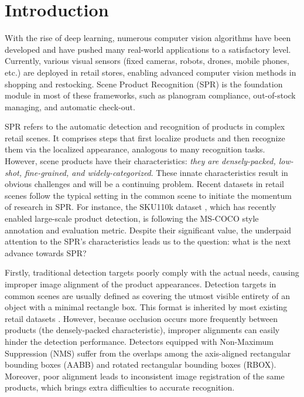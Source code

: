 \documentclass[runningheads]{llncs}
\begin{document}
\section{Introduction}
With the rise of deep learning, numerous computer vision algorithms have been developed and have pushed many real-world applications to a satisfactory level. Currently, various visual sensors (fixed cameras, robots, drones, mobile phones, etc.) are deployed in retail stores, enabling advanced computer vision methods in shopping and restocking. Scene Product Recognition (SPR) is the foundation module in most of these frameworks, such as planogram compliance, out-of-stock managing, and automatic check-out.

SPR refers to the automatic detection and recognition of products in complex retail scenes. It comprises steps that first localize products and then recognize them via the localized appearance, analogous to many recognition tasks. However, scene products have their characteristics: \textit{they are densely-packed, low-shot, fine-grained, and widely-categorized}. These innate characteristics result in obvious challenges and will be a continuing problem. Recent datasets in retail scenes follow the typical setting in the common scene to initiate the momentum of research in SPR. For instance, the SKU110k dataset \cite{SKU110k}, which has recently enabled large-scale product detection, is following the MS-COCO \cite{lin2014microsoft} style annotation and evaluation metric. Despite their significant value, the underpaid attention to the SPR's characteristics leads us to the question: what is the next advance towards SPR?


Firstly, traditional detection targets poorly comply with the actual needs, causing improper image alignment of the product appearances. Detection targets in common scenes \cite{lin2014microsoft,yang2016wider,voc_dataset,DOTA2021} are usually defined as covering the utmost visible entirety of an object with a minimal rectangle box. This format is inherited by most existing retail datasets \cite{SKU110k,rpc,Grozi-3.2k,Grocery_shelves,locount}. However, because occlusion occurs more frequently between products (the densely-packed characteristic), improper alignments can easily hinder the detection performance. Detectors equipped with Non-Maximum Suppression (NMS) suffer from the overlaps among the axis-aligned rectangular bounding boxes (AABB) and rotated rectangular bounding boxes (RBOX). Moreover, poor alignment leads to inconsistent image registration of the same products, which brings extra difficulties to accurate recognition.   
\end{document}
